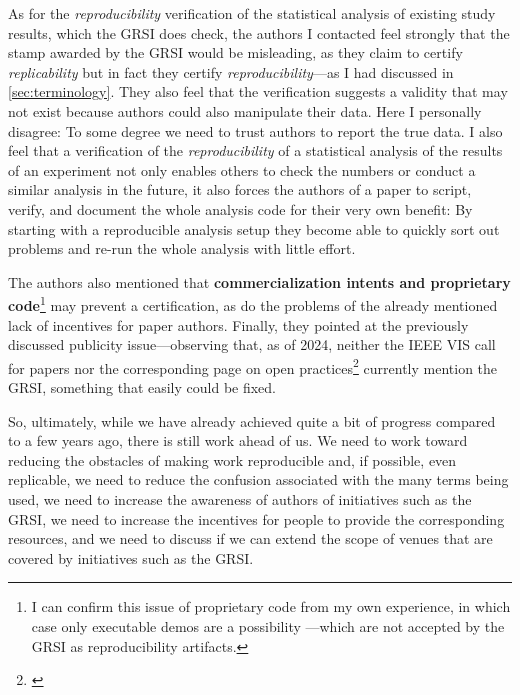 \documentclass[conference,svgnames]{vgtc}                     %
\begin{document}
As for the \emph{reproducibility} verification of the statistical analysis of existing study results, which the GRSI does check, the authors I contacted feel strongly that the stamp awarded by the GRSI would be misleading, as they claim to certify \emph{replicability} but in fact they certify \emph{reproducibility}---as I had discussed in \autoref{sec:terminology}. They also feel that the verification suggests a validity that may not exist because authors could also manipulate their data. Here I personally disagree: To some degree we need to trust authors to report the true data. I also feel that a verification of the \emph{reproducibility} of a statistical analysis of the results of an experiment not only enables others to check the numbers or conduct a similar analysis in the future, it also forces the authors of a paper to script, verify, and document the whole analysis code for their very own benefit: By starting with a reproducible analysis setup they become able to quickly sort out problems and re-run the whole analysis with little effort.

The authors also mentioned that \textbf{commercialization intents and proprietary code}\footnote{I can confirm this issue of proprietary code from my own experience, in which case only executable demos are a possibility \cite{Isenberg:2022:PEP}---which are not accepted by the GRSI as reproducibility artifacts.} may prevent a certification, as do the problems of the already mentioned lack of incentives for paper authors. Finally, they pointed at the previously discussed publicity issue---observing that, as of 2024, neither the IEEE VIS call for papers nor the corresponding page on open practices\footnote{\href{https://ieeevis.org/year/2024/info/open-practices/open-practices}{}} currently mention the GRSI, something that easily could be fixed.

So, ultimately, while we have already achieved quite a bit of progress compared to a few years ago, there is still work ahead of us. We need to work toward reducing the obstacles of making work reproducible and, if possible, even replicable, we need to reduce the confusion associated with the many terms being used, we need to increase the awareness of authors of initiatives such as the GRSI, we need to increase the incentives for people to provide the corresponding resources, and we need to discuss if we can extend the scope of venues that are covered by initiatives such as the GRSI.
\end{document}
